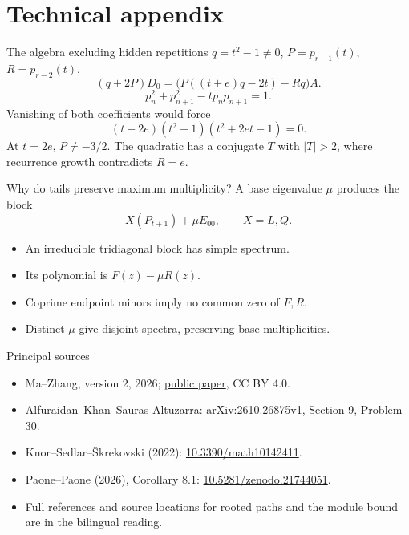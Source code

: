 \documentclass{beamer}
\begin{document}
\section{Technical appendix}
\begin{frame}{The algebra excluding hidden repetitions}
\small
$q=t^2-1\ne0$, $P=p_{r-1}(t)$, $R=p_{r-2}(t)$.
\[
(q+2P)D_0=\bigl(P((t+e)q-2t)-Rq\bigr)A.
\]
\[
p_n^2+p_{n+1}^2-tp_np_{n+1}=1.
\]
Vanishing of both coefficients would force
\[
(t-2e)(t^2-1)(t^2+2et-1)=0.
\]
At $t=2e$, $P\ne-3/2$. The quadratic has a conjugate $T$ with $|T|>2$, where recurrence growth contradicts $R=e$.
\end{frame}
\begin{frame}{Why do tails preserve maximum multiplicity?}
A base eigenvalue $\mu$ produces the block
\[
X(P_{t+1})+\mu E_{00},\qquad X=L,Q.
\]
\begin{itemize}
\item An irreducible tridiagonal block has simple spectrum.
\item Its polynomial is $F(z)-\mu R(z)$.
\item Coprime endpoint minors imply no common zero of $F,R$.
\item Distinct $\mu$ give disjoint spectra, preserving base multiplicities.
\end{itemize}
\end{frame}
\begin{frame}{Principal sources}
\footnotesize
\begin{itemize}
\item Ma--Zhang, version 2, 2026; \href{https://mathesis-omega-research.apps.chrono-ai.fun/papers/aks2610-twin-free-theta-separation?version=2}{public paper}, CC BY 4.0.
\item Alfuraidan--Khan--Sauras-Altuzarra: arXiv:2610.26875v1, Section 9, Problem 30.
\item Knor--Sedlar--Škrekovski (2022): \href{https://doi.org/10.3390/math10142411}{10.3390/math10142411}.
\item Paone--Paone (2026), Corollary 8.1: \href{https://doi.org/10.5281/zenodo.21744051}{10.5281/zenodo.21744051}.
\item Full references and source locations for rooted paths and the module bound are in the bilingual reading.
\end{itemize}
\end{frame}
\FormalVerification
\end{document}
